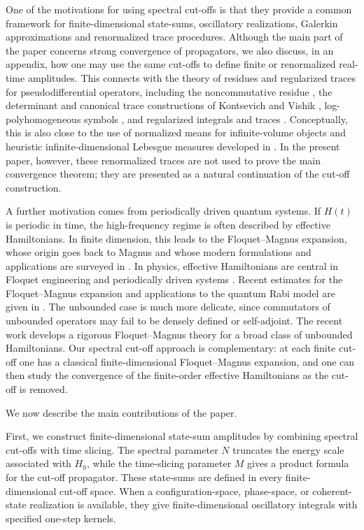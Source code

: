 \documentclass[11pt]{amsart}
\theoremstyle{plain}
\theoremstyle{definition}
\theoremstyle{remark}
\begin{document}
One of the motivations for using spectral cut-offs is that they provide
a common framework for finite-dimensional state-sums, oscillatory
realizations, Galerkin approximations and renormalized trace procedures.
Although the main part of the paper concerns strong convergence of propagators,
we also discuss, in an appendix, how one may use the same cut-offs to
define finite or renormalized real-time amplitudes.  This connects with
the theory of residues and regularized traces for pseudodifferential
operators, including the noncommutative residue
\cite{Wodzicki1984}, the determinant and canonical trace constructions
of Kontsevich and Vishik \cite{KontsevichVishik1994}, log-polyhomogeneous
symbols \cite{Lesch1999}, and regularized integrals and traces
\cite{PaychaScott2007,Paycha2012}.  Conceptually, this is also close to
the use of normalized means for infinite-volume objects and heuristic
infinite-dimensional Lebesgue measures developed in
\cite{Magnot2017MeanValue}.  In the present paper, however, these
renormalized traces are not used to prove the main convergence theorem;
they are presented as a natural continuation of the cut-off
construction.

A further motivation comes from periodically driven quantum systems.
If \(H(t)\) is periodic in time, the high-frequency regime is often
described by effective Hamiltonians.  In finite dimension, this leads to
the Floquet--Magnus expansion, whose origin goes back to Magnus
\cite{Magnus1954} and whose modern formulations and applications are
surveyed in \cite{BlanesCasasOteoRos2009}.  In physics, effective
Hamiltonians are central in Floquet engineering and periodically driven
systems \cite{GoldmanDalibard2014,BukovDAlessioPolkovnikov2015}.
Recent estimates for the Floquet--Magnus expansion and applications to
the quantum Rabi model are given in
\cite{DeyLonigroYuasaBurgarth2025}.  The unbounded case is much more
delicate, since commutators of unbounded operators may fail to be
densely defined or self-adjoint.  The recent work
\cite{BurgarthHillierLonigroRichter2026} develops a rigorous
Floquet--Magnus theory for a broad class of unbounded Hamiltonians.  Our
spectral cut-off approach is complementary: at each finite cut-off one
has a classical finite-dimensional Floquet--Magnus expansion, and one
can then study the convergence of the finite-order effective
Hamiltonians as the cut-off is removed.

We now describe the main contributions of the paper.

First, we construct finite-dimensional state-sum amplitudes by combining
spectral cut-offs with time slicing.  The
spectral parameter \(N\) truncates the energy scale associated with
\(H_0\), while the time-slicing parameter \(M\) gives a product formula
for the cut-off propagator.  These state-sums are defined in every
finite-dimensional cut-off space.  When a configuration-space,
phase-space, or coherent-state realization is available, they give
finite-dimensional oscillatory integrals with specified one-step kernels.
\end{document}

